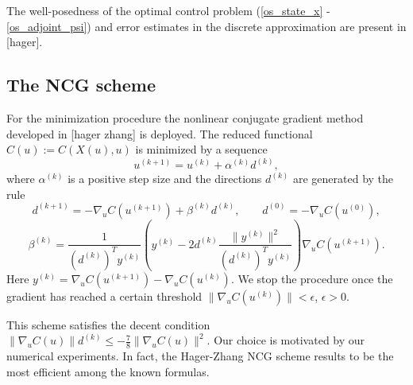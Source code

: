 \documentclass[a4paper,10pt, english]{article}
\begin{document}
 The well-posedness of the optimal control problem (\ref{os_state_x} - \ref{os_adjoint_psi}) and error estimates in the discrete approximation are present in [hager].
 


 \subsection{The NCG scheme}
  For the minimization procedure the nonlinear conjugate gradient  method developed in [hager zhang] is deployed.
  The reduced functional $C(u):=C(X(u), u)$ is minimized by a sequence
  \begin{equation}
  u^{(k+1)} =   u^{(k)} + \alpha^{(k)} d^{(k)},
  \label{ncgscheme}
   \end{equation}  
  where $\alpha^{(k)}$ is a positive step size and the directions $d^{(k)}$ are generated by the rule
  \begin{equation}
  d^{(k+1)} = - \nabla_u C(u^{(k+1)}) + \beta^{(k)} d^{(k)}, \qquad d^{(0)} = -\nabla_u C(u^{(0)}),
  \label{drct}
  \end{equation}
  \begin{equation}
  \beta^{(k)} = \frac{1}{(d^{(k)})^T y^{(k)}} \left( y^{(k)} - 2d^{(k)}\frac{\|y^{(k)}\|^2}{(d^{(k)})^T y^{(k)}}\right)\nabla_u C(u^{(k+1)}).
  \label{drct}
  \end{equation}  
  Here $y^{(k)} = \nabla_u C(u^{(k+1)}) - \nabla_u C(u^{(k)})$. 
  We stop the procedure once the gradient has reached a certain threshold $\|\nabla_u C(u^{(k)})\| < \epsilon$, $\epsilon > 0$.
   
  This scheme satisfies the decent condition $\|\nabla_u C(u)\|d^{(k)} \leq -\frac{7}{8}\|\nabla_u C(u)\|^2$. Our choice is motivated by our numerical experiments. In fact, the Hager-Zhang NCG scheme results to be the most efficient among the known formulas. 
  
  
 
 
 
\end{document}
